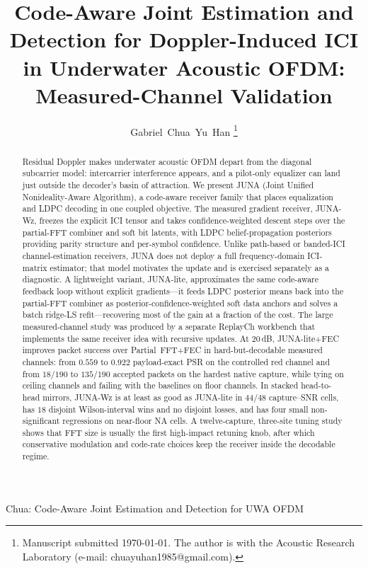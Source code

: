 \documentclass[journal]{IEEEtran}
\newcommand{\juna}{JUNA}
\newcommand{\junalite}{JUNA-lite}
\newcommand{\junawz}{JUNA-Wz}
\begin{document}
\title{Code-Aware Joint Estimation and Detection for Doppler-Induced ICI in
Underwater Acoustic OFDM: Measured-Channel Validation}

\author{Gabriel~Chua~Yu~Han
\thanks{Manuscript submitted \today. The author is with the Acoustic Research
Laboratory (e-mail: chuayuhan1985@gmail.com).}}

%
{Chua: Code-Aware Joint Estimation and Detection for UWA OFDM}
\maketitle

\begin{abstract}
Residual Doppler makes underwater acoustic OFDM depart from the diagonal
subcarrier model: intercarrier interference appears, and a pilot-only equalizer
can land just outside the decoder's basin of attraction. We present \juna{}
(Joint Unified Nonideality-Aware Algorithm), a code-aware receiver family that
places equalization and LDPC decoding in one coupled objective. The measured
gradient receiver, \junawz{}, freezes the explicit ICI tensor and takes
confidence-weighted descent steps over the partial-FFT combiner and soft bit
latents, with LDPC belief-propagation posteriors providing parity structure and
per-symbol confidence. Unlike path-based or banded-ICI channel-estimation
receivers, \juna{} does not deploy a full frequency-domain ICI-matrix estimator;
that model motivates the update and is exercised separately as a diagnostic. A
lightweight variant, \junalite{}, approximates the same code-aware feedback loop
without explicit gradients---it feeds LDPC posterior means back into the
partial-FFT combiner as posterior-confidence-weighted soft data anchors and
solves a batch ridge-LS refit---recovering most of the gain at a fraction of the
cost. The large measured-channel study was produced by a separate ReplayCh
workbench that implements the same receiver idea with recursive updates. At
20\,dB, \junalite{}+FEC improves packet success over Partial~FFT+FEC in
hard-but-decodable measured channels: from $0.559$ to $0.922$ payload-exact PSR
on the controlled red channel and from $18/190$ to $135/190$ accepted packets on
the hardest native capture, while tying on ceiling channels and failing with the
baselines on floor channels. In stacked head-to-head mirrors, \junawz{} is at
least as good as \junalite{} in $44/48$ capture--SNR cells, has $18$ disjoint
Wilson-interval wins and no disjoint losses, and has four small non-significant
regressions on near-floor NA cells. A
twelve-capture, three-site tuning study shows that FFT size is usually the first
high-impact retuning knob, after which conservative modulation and code-rate
choices keep the receiver inside the decodable regime.
\end{abstract}
\end{document}
